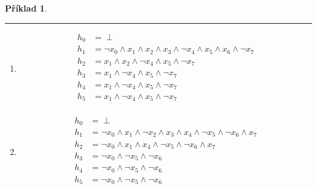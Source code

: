 \documentclass[a4paper]{article}
\theoremstyle{definition}
\newtheorem{priklad}{Příklad}
\begin{document}
\begin{priklad}
\noindent\rule{\linewidth}{.2pt}

\begin{enumerate}
  \item %
  \begin{align*}
  h_0 &= \perp \\
  h_1 &= \neg x_0 \wedge x_1 \wedge x_2 \wedge x_3 \wedge \neg x_4 \wedge x_5 \wedge x_6 \wedge \neg x_7 \\
  h_2 &= x_1 \wedge x_2 \wedge \neg x_4 \wedge x_5 \wedge \neg x_7 \\
  h_3 &= x_1 \wedge \neg x_4 \wedge x_5 \wedge \neg x_7 \\
  h_4 &= x_1 \wedge \neg x_4 \wedge x_5 \wedge \neg x_7 \\
  h_5 &= x_1 \wedge \neg x_4 \wedge x_5 \wedge \neg x_7 \\
\end{align*}
  
  \item %
  \begin{align*}
  h_0 &= \perp \\
  h_1 &= \neg x_0 \wedge x_1 \wedge \neg x_2 \wedge x_3 \wedge x_4 \wedge \neg x_5 \wedge \neg x_6 \wedge x_7 \\
  h_2 &= \neg x_0 \wedge x_1 \wedge x_4 \wedge \neg x_5 \wedge \neg x_6 \wedge x_7 \\
  h_3 &= \neg x_0 \wedge \neg x_5 \wedge \neg x_6 \\
  h_4 &= \neg x_0 \wedge \neg x_5 \wedge \neg x_6 \\
  h_5 &= \neg x_0 \wedge \neg x_5 \wedge \neg x_6 \\
\end{align*}
\end{enumerate}
\end{priklad}
\end{document}
